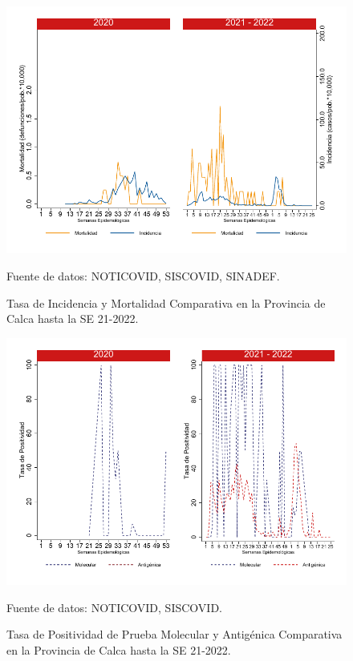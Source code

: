\documentclass[12pt,a4paper,openany]{book}
\begin{document}
	\begin{figure}[h]
		\caption{Tasa de Incidencia y Mortalidad Comparativa en la Provincia de Calca hasta la SE 21-2022.}\label{fig:inc_mort_calca}
		\begin{center}
			\includegraphics[width=0.85\linewidth]{../figuras/incidencia_mortalidad_20_21_4.pdf}
		\end{center}
		{\footnotesize {Fuente de datos: NOTICOVID, SISCOVID, SINADEF.}}
	\end{figure}
	
	\begin{figure}[h]
		\caption{Tasa de Positividad de Prueba Molecular y Antigénica Comparativa en la Provincia de Calca hasta la SE 21-2022.}\label{fig:positividad_calca}
		\begin{center}
			\includegraphics[width=0.7\linewidth]{../figuras/positividad_20_21_4.pdf}
		\end{center}
		{\footnotesize {Fuente de datos: NOTICOVID, SISCOVID.}}
	\end{figure}
	
\end{document}

